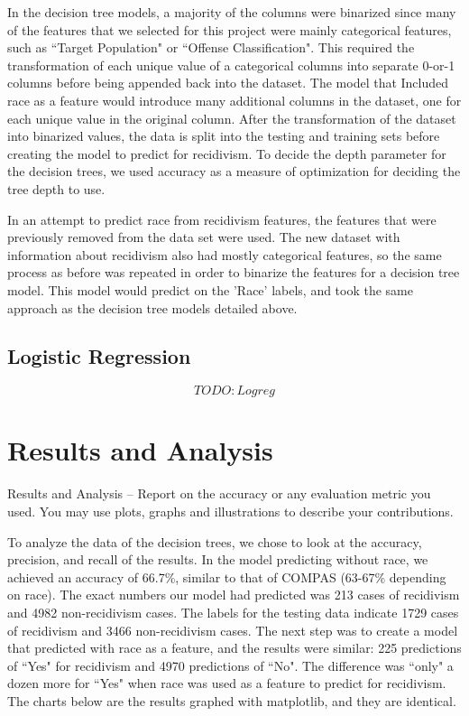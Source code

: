 \documentclass[11pt, sigconf]{acmart}
\begin{document}
In the decision tree models, a majority of the columns were binarized since many of the features that we selected for this project were mainly categorical features, such as ``Target Population" or ``Offense Classification". This required the transformation of each unique value of a categorical columns into separate 0-or-1 columns before being appended back into the dataset. The model that Included race as a feature would introduce many additional columns in the dataset, one for each unique value in the original column. After the transformation of the dataset into binarized values, the data is split into the testing and training sets before creating the model to predict for recidivism. To decide the depth parameter for the decision trees, we used accuracy as a measure of optimization for deciding the tree depth to use. 

In an attempt to predict race from recidivism features, the features that were previously removed from the data set were used. The new dataset with information about recidivism also had mostly categorical features, so the same process as before was repeated in order to binarize the features for a decision tree model. This model would predict on the 'Race' labels, and took the same approach as the decision tree models detailed above. 

\subsection{Logistic Regression}
$$TODO: Logreg$$




\section{Results and Analysis}
Results and Analysis – Report on the accuracy or any evaluation metric you used. You may use
plots, graphs and illustrations to describe your contributions.

To analyze the data of the decision trees, we chose to look at the accuracy, precision, and recall of the results. In the model predicting without race, we achieved an accuracy of 66.7\%, similar to that of COMPAS (63-67\% depending on race). The exact numbers our model had predicted was 213 cases of recidivism and 4982 non-recidivism cases. The labels for the testing data indicate 1729 cases of recidivism and 3466 non-recidivism cases. The next step was to create a model that predicted with race as a feature, and the results were similar: 225 predictions of ``Yes" for recidivism and 4970 predictions of ``No". The difference was ``only" a dozen more for ``Yes" when race was used as a feature to predict for recidivism. The charts below are the results graphed with matplotlib, and they are identical. 
\end{document}
